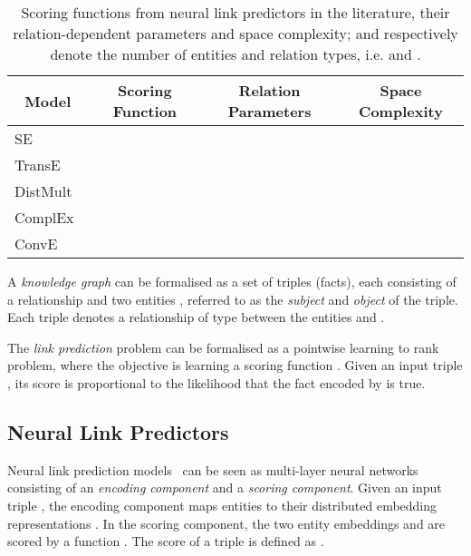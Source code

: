 \documentclass[letterpaper]{article}
\newcommand{\citep}{\cite}
\begin{document}
\begin{center}
\begin{table*}[ht]
\caption{Scoring functions  from neural link predictors in the literature, their relation-dependent parameters and space complexity;  and  respectively denote the number of entities and relation types, i.e.  and .} \label{tab:overview}
\begin{center}
\begin{tabularx}{\textwidth}{lccc}
\toprule
\multicolumn{1}{c}{\bf Model} & {\bf Scoring Function}  & {\bf Relation Parameters} & {\bf Space Complexity} \\
\hline
SE~\citep{DBLP:journals/ml/BordesGWB14} &  &  & \\
TransE~\citep{DBLP:conf/nips/BordesUGWY13} &  &  &  \\
DistMult~\citep{yang15:embedding} &  &  &  \\
ComplEx~\citep{DBLP:conf/icml/TrouillonWRGB16} &  &  &  \\
ConvE &  &  &  \\
\bottomrule
\end{tabularx}
\end{center}
\end{table*}
\end{center}


A \emph{knowledge graph}  can be formalised as a set of triples (facts), each consisting of a relationship  and two entities , referred to as the \emph{subject} and \emph{object} of the triple.
Each triple  denotes a relationship of type  between the entities  and .


The \emph{link prediction} problem can be formalised as a pointwise learning to rank problem, where the objective is learning a scoring function .
Given an input triple , its score  is proportional to the likelihood that the fact encoded by  is true.


\subsection{Neural Link Predictors}


Neural link prediction models~\citep{nickel2016review} can be seen as multi-layer neural networks consisting of an \emph{encoding component} and a \emph{scoring component}.
Given an input triple , the encoding component maps entities  to their distributed embedding representations .
In the scoring component, the two entity embeddings  and  are scored by a function .
The score of a triple  is defined as .
\end{document}
